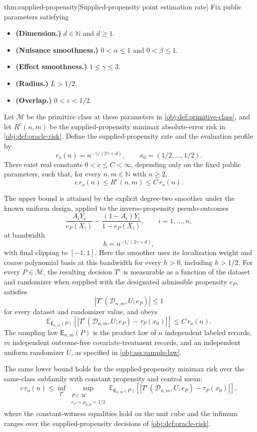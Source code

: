 \documentclass[11pt]{article}
\begin{document}
\begin{theoremv}{thm:supplied-propensity}[Supplied-propensity point estimation rate]
Fix public parameters satisfying
\begin{itemize}
\item \textbf{(Dimension.)} \(d\in\mathbb N\) and \(d\ge1\).
\item \textbf{(Nuisance smoothness.)} \(0<\alpha\le1\) and \(0<\beta\le1\).
\item \textbf{(Effect smoothness.)} \(1\le\gamma\le3\).
\item \textbf{(Radius.)} \(L>1/2\).
\item \textbf{(Overlap.)} \(0<\varepsilon<1/2\).
\end{itemize}
Let \(\mathcal M\) be the primitive class at these parameters in \cref{obj:def:primitive-class}, and let \(R^e(n,m)\) be the supplied-propensity minimax absolute-error risk in \cref{obj:def:oracle-risk}. Define the supplied-propensity rate and the evaluation profile by
\[
r_o(n)=n^{-\gamma/(2\gamma+d)},
\qquad
x_0=(1/2,\ldots,1/2).
\]
There exist real constants \(0<c\le C<\infty\), depending only on the fixed public parameters, such that, for every \(n,m\in\mathbb N\) with \(n\ge2\),
\[
c\,r_o(n)\le R^e(n,m)\le C\,r_o(n).
\]

The upper bound is attained by the explicit degree-two smoother under the known uniform design, applied to the inverse-propensity pseudo-outcomes
\[
\frac{A_iY_i}{e_P(X_i)}
-
\frac{(1-A_i)Y_i}{1-e_P(X_i)},
\qquad i=1,\ldots,n,
\]
at bandwidth
\[
h=n^{-1/(2\gamma+d)},
\]
with final clipping to \([-1,1]\). Here the smoother uses its localization weight and coarse polynomial basis at this bandwidth for every \(h>0\), including \(h>1/2\). For every \(P\in\mathcal M\), the resulting decision \(T^e\) is measurable as a function of the dataset and randomizer when supplied with the designated admissible propensity \(e_P\), satisfies
\[
\left|T^e(\mathcal D_{n,m},U;e_P)\right|\le1
\]
for every dataset and randomizer value, and obeys
\[
\mathbb E_{\mathsf E_{n,m}(P)}
\left[
\left|T^e(\mathcal D_{n,m},U;e_P)-\tau_P(x_0)\right|
\right]
\le C\,r_o(n).
\]
The sampling law \(\mathsf E_{n,m}(P)\) is the product law of \(n\) independent labeled records, \(m\) independent outcome-free covariate-treatment records, and an independent uniform randomizer \(U\), as specified in \cref{obj:ass:sample-law}.

The same lower bound holds for the supplied-propensity minimax risk over the same-class subfamily with constant propensity and control mean:
\[
c\,r_o(n)\le
\inf_{T^e}
\sup_{\substack{P\in\mathcal M\\ e_P=\mu_{0,P}=1/2}}
\mathbb E_{\mathsf E_{n,m}(P)}
\left[
\left|T^e(\mathcal D_{n,m},U;e_P)-\tau_P(x_0)\right|
\right],
\]
where the constant-witness equalities hold on the unit cube and the infimum ranges over the supplied-propensity decisions of \cref{obj:def:oracle-risk}.
\end{theoremv}
\end{document}
